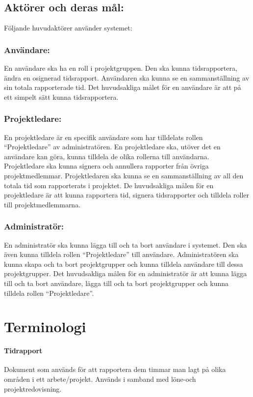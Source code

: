 \documentclass[paper=a4, fontsize=11pt,twoside]{article}
\begin{document}
	\subsection{Aktörer och deras mål:}
	Följande huvudaktörer använder systemet:
	\subsubsection{Användare:}
	En användare ska ha en roll i projektgruppen. Den ska kunna tidsrapportera, ändra en osignerad tidsrapport. Användaren ska kunna se en sammanställning av sin totala rapporterade tid. Det huvudsakliga målet för en användare är att på ett simpelt sätt kunna tidsrapportera.
	\subsubsection{Projektledare:}
	En projektledare är en specifik användare som har tilldelats rollen “Projektledare” av administratören. En projektledare ska, utöver det en användare kan göra, kunna tilldela de olika rollerna till användarna. Projektledare ska kunna signera och annullera rapporter från övriga projektmedlemmar. Projektledaren ska kunna se en sammanställning av all den totala tid som rapporterats i projektet. De huvudsakliga målen för en projektledare är att kunna rapportera tid, signera tidsrapporter och tilldela roller till projektmedlemmarna. 
	\subsubsection{Administratör:}
	En administratör ska kunna lägga till och ta bort användare i systemet. Den ska även kunna tilldela rollen “Projektledare” till användare. Administratören ska kunna skapa och ta bort projektgrupper och kunna tilldela användare till dessa projektgrupper. Det huvudsakliga målen för en administratör är att kunna lägga till och ta bort användare, lägga till och ta bort projektgrupper och kunna tilldela rollen “Projektledare”.
	
	\section{Terminologi}
	\paragraph{Tidrapport}
	\flushleft
	Dokument som används för att rapportera dem timmar man lagt på olika områden i ett arbete/projekt. Används i samband med löne-och projektredovisning.
\end{document}
